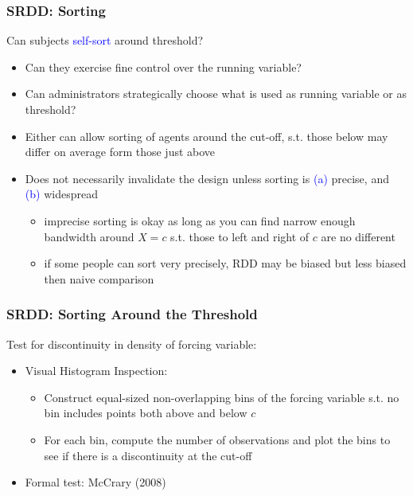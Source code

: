 \documentclass[xcolor=dvipsnames]{beamer}
\begin{document}
\begin{frame}
\frametitle{SRDD: Sorting}
 Can subjects \textcolor{Blue}{self-sort} around threshold?
  \begin{itemize}
  \small
    \item<2-> Can they exercise fine control over the running variable?
    \item<3-> Can administrators strategically choose what is used as running variable or as threshold? 
    \item<4-> Either can allow sorting of agents around the cut-off, s.t. those below may differ on average form those just above
        \item<5-> Does not necessarily invalidate the design unless sorting is \textcolor{Blue}{(a)} precise, and \textcolor{Blue}{(b)} widespread
        \begin{itemize}
        \item<6->[(a)] imprecise sorting is okay as long as you can find narrow enough bandwidth around $X=c$ s.t. those to left and right of $c$ are no different
        \item<7->[(b)] if some people can sort very precisely, RDD may be biased but less biased then naive comparison 
        \end{itemize}
  \end{itemize}\bigskip
\end{frame}

\begin{frame}[fragile]
\frametitle{SRDD: Sorting Around the Threshold}
 Test for discontinuity in density of forcing variable:
\small
  \begin{itemize}
  \item<2-> Visual Histogram Inspection:
  \footnotesize
  \begin{itemize}\medskip
    \item<2-> Construct equal-sized non-overlapping bins of the forcing variable s.t. no bin includes points both above and below $c$ \medskip
    \item<2-> For each bin, compute the number of observations and plot the bins to see if there is a discontinuity at the cut-off
  \end{itemize}\bigskip  
  \small
        \item<3-> Formal test: McCrary (2008)
  \end{itemize}
\end{frame}
\end{document}

